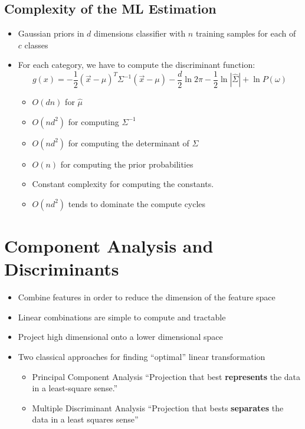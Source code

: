 \subsection{Complexity of the ML Estimation}
\begin{itemize}
	\item Gaussian priors in $d$ dimensions classifier with $n$ training samples for each of $c$ classes 
	\item For each category, we have to compute the discriminant function:
	\begin{equation}
		g(x) = - \frac{1}{2} ( \vec{x} - \mu) ^T  \Sigma^{-1} ( \vec{x} - \mu) - \frac{d}{2}\ln {2\pi} - \frac{1}{2} \ln|\hat{\Sigma} | + \ln P(\omega)
	\end{equation}
	\begin{itemize}
		\item $O(d n)$ for $\hat{\mu}$ 
		\item $O(n d^2)$ for computing $\Sigma ^{-1}$ 
		\item $O(nd^2)$ for computing the determinant of $\Sigma$
		\item $O(n)$ for computing the prior probabilities
		\item Constant complexity for computing the constants.
		\item $O(n d^2)$ tends to dominate the compute cycles 
	\end{itemize}
	
	
\end{itemize}


\section{Component Analysis and Discriminants}
\begin{itemize}
	\item Combine features in order to reduce the dimension of the feature space
	\item Linear combinations are simple to compute and tractable 
	\item Project high dimensional onto a lower dimensional space
	\item Two classical approaches for finding ``optimal'' linear transformation
	\begin{itemize}
		\item Principal Component Analysis ``Projection that best \textbf{represents} the data in a least-square sense.'' 
		\item Multiple Discriminant Analysis ``Projection that bests \textbf{separates} the data in a least squares sense''
	\end{itemize}
	
\end{itemize}

